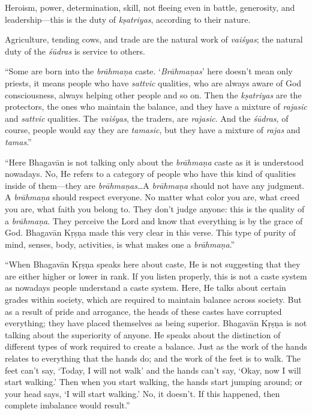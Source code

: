 {Heroism, power, determination, skill, not fleeing even in battle, generosity, and leadership---this is the duty of \textit{kṣatriyas}, according to their nature.}

{Agriculture, tending cows, and trade are the natural work of \textit{vaiśyas}; the natural duty of the \textit{śūdras} is service to others.}

\enquote{Some are born into the \textit{brāhmaṇa} caste. \enquote{\textit{Brāhmaṇas}} here doesn’t mean only priests, it means people who have \textit{sattvic} qualities, who are always aware of God consciousness, always helping other people and so on. Then the \textit{kṣatriyas} are the protectors, the ones who maintain the balance, and they have a mixture of \textit{rajasic} and \textit{sattvic} qualities. The \textit{vaiśyas}, the traders, are \textit{rajasic}. And the \textit{śūdras}, of course, people would say they are \textit{tamasic}, but they have a mixture of \textit{rajas} and \textit{tamas}.}

\enquote{Here Bhagavān is not talking only about the \textit{brāhmaṇa} caste as it is understood nowadays. No, He refers to a category of people who have this kind of qualities inside of them---they are \textit{brāhmaṇas}\ldots A \textit{brāhmaṇa} should not have any judgment. A \textit{brāhmaṇa} should respect everyone. No matter what color you are, what creed you are, what faith you belong to. They don’t judge anyone: this is the quality of a \textit{brāhmaṇa}. They perceive the Lord and know that everything is by the grace of God. Bhagavān Kṛṣṇa made this very clear in this verse. This type of purity of mind, senses, body, activities, is what makes one a \textit{brāhmaṇa}.}

\enquote{When Bhagavān Kṛṣṇa speaks here about caste, He is not suggesting that they are either higher or lower in rank. If you listen properly, this is not a caste system as nowadays people understand a caste system. Here, He talks about certain grades within society, which are required to maintain balance across society. But as a result of pride and arrogance, the heads of these castes have corrupted everything; they have placed themselves as being superior. Bhagavān Kṛṣṇa is not talking about the superiority of anyone. He speaks about the distinction of different types of work required to create a balance. Just as the work of the hands relates to everything that the hands do; and the work of the feet is to walk. The feet can’t say, \enquote{Today, I will not walk} and the hands can’t say, \enquote{Okay, now I will start walking.} Then when you start walking, the hands start jumping around; or your head says, \enquote{I will start walking.} No, it doesn’t. If this happened, then complete imbalance would result.}

